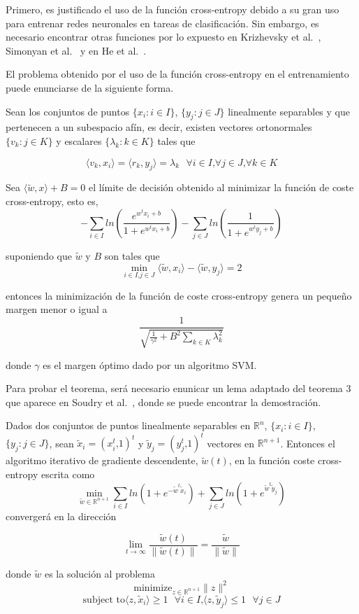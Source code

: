 Primero, es justificado el uso de la función cross-entropy debido a su gran uso para entrenar redes neuronales en tareas de clasificación. Sin embargo, es necesario encontrar otras funciones por lo expuesto en Krizhevsky et al.~\cite{LossFunc1}, Simonyan et al.~\cite{LossFunc2} y en He et al.~\cite{LossFunc3}.

El problema obtenido por el uso de la función cross-entropy en el entrenamiento puede enunciarse de la siguiente forma.

\begin{teorema} \label{teom221}
Sean los conjuntos de puntos $\{x_i:i \in I\}$, $\{y_j: j \in J\}$ linealmente separables y que pertenecen a un subespacio afín, es decir, existen vectores ortonormales $\{v_k: j \in K\}$ y escalares $\{\lambda_k: k \in K\}$ tales que

$$\langle v_k,x_i \rangle=\langle r_k,y_j \rangle=\lambda_k \text{ } \forall i \in I\text{,} \forall j \in J \text{,} \forall k \in K$$

Sea $\langle \tilde{w},x \rangle + B=0$ el límite de decisión obtenido al minimizar la función de coste cross-entropy, esto es,
$$- \sum_{i \in I} ln \left( \frac{e^{w^{t}x_i+b}}{1+e^{w^{t}x_i+b}} \right) - \sum_{j \in J} ln \left( \frac{1}{1+e^{w^{t}y_j+b}} \right)$$

suponiendo que $\tilde{w}$ y $B$ son tales que
$$\min_{i \in I \text{,} j \in J} \langle \tilde{w},x_i \rangle - \langle \tilde{w},y_j \rangle = 2$$

entonces la minimización de la función de coste cross-entropy genera un pequeño margen menor o igual a 
$$\frac{1}{\sqrt{\frac{1}{\gamma^2}+B^2 \sum_{k \in K} \lambda_k^2}}$$

donde $\gamma$ es el margen óptimo dado por un algoritmo SVM.
\end{teorema}

Para probar el teorema, será necesario enunicar un lema adaptado del teorema 3 que aparece en Soudry et al.~\cite{ThForLemma}, donde se puede encontrar la demostración.

\begin{lema} \label{lem219}
Dados dos conjuntos de puntos linealmente separables en $\mathbb{R}^n$, $\{x_i: i \in I\}$, $\{y_j: j \in J\}$, sean $\tilde{x}_i=(x_i^{t} \text{,} 1)^{t}$ y $\tilde{y}_j=(y_j^{t} \text{,} 1)^{t}$ vectores en $\mathbb{R}^{n+1}$. Entonces el algoritmo iterativo de gradiente descendente, $\tilde{w}(t)$, en la función coste cross-entropy escrita como
$$\min_{\tilde{w} \in \mathbb{R}^{n+1}} \sum_{i \in I} ln(1+e^{-\tilde{w}^{t}\tilde{x}_i}) + \sum_{j \in J} ln(1+e^{\tilde{w}^{t}\tilde{y}_j})$$
convergerá en la dirección

$$\lim_{t \to \infty} \frac{\tilde{w}(t)}{\|\tilde{w}(t) \|} = \frac{\tilde{w}}{\|\tilde{w} \|}$$

donde $\tilde{w}$ es la solución al problema
$$\text{minimize}_{z \in \mathbb{R}^{n+1}} \|z \|^2$$
$$\text{subject to} \langle z,\tilde{x}_i \rangle \geq 1 \text{ } \forall i \in I \text{,} \langle z,\tilde{y}_j \rangle \leq 1 \text{ } \forall j \in J$$
\end{lema}

